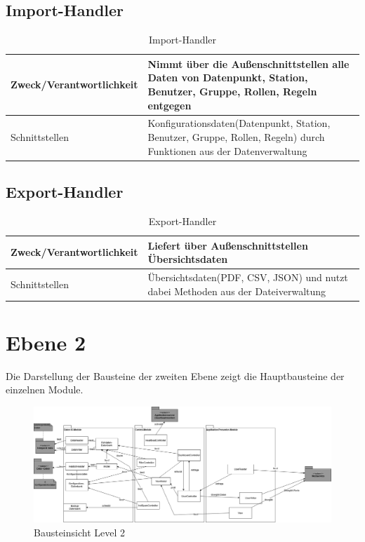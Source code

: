 \subsection{Import-Handler}
\begin{table}[th]
	\begin{tabularx}{\textwidth}{p{5cm} X}
		\hline
		Zweck/Verantwortlichkeit & Nimmt über die Außenschnittstellen alle Daten von Datenpunkt, Station, Benutzer, Gruppe, Rollen, Regeln entgegen \\
		\hline
		Schnittstellen & Konfigurationsdaten(Datenpunkt, Station, Benutzer, Gruppe, Rollen, Regeln) durch Funktionen aus der Datenverwaltung \\
		\hline
	\end{tabularx} 
	\caption{Import-Handler}
	\label{tab:Import-Handler}
\end{table}

\subsection{Export-Handler}
\begin{table}[th]
	\begin{tabularx}{\textwidth}{p{5cm} X}
		\hline
		Zweck/Verantwortlichkeit & Liefert über Außenschnittstellen Übersichtsdaten \\
		\hline
		Schnittstellen & Übersichtsdaten(PDF, CSV, JSON) und nutzt dabei Methoden aus der Dateiverwaltung\\
		\hline
	\end{tabularx} 
	\caption{Export-Handler}
	\label{tab:ExportHandler}
\end{table}
\clearpage
\section{Ebene 2}
Die Darstellung der Bausteine der zweiten Ebene zeigt die Hauptbausteine der einzelnen Module.
\begin{figure}[h]
	\centering
	\includegraphics[width=1\textwidth]{Graphics/bausteinansicht_ebene_2.png}
	\caption{Bausteinsicht Level 2}
	\label{fig:bausteinsichtlvl2}
\end{figure}
                 
